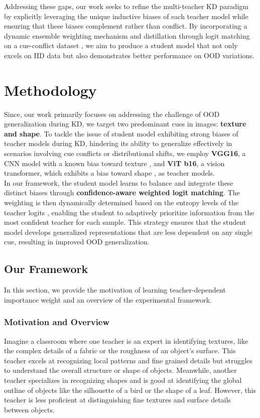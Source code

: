 \documentclass{article}
\begin{document}
Addressing these gaps, our work seeks to refine the multi-teacher KD paradigm by explicitly leveraging the unique inductive biases of each teacher model while ensuring that these biases complement rather than conflict. By incorporating a dynamic ensemble weighting mechanism and distillation through logit matching \cite{hinton2015distilling} on a cue-conflict dataset \cite{texture-vs-shape}, we aim to produce a student model that not only excels on IID data but also demonstrates better performance on OOD variations.


\section{Methodology}
Since, our work primarily focuses on addressing the challenge of OOD generalization during KD, we target two predominant cues in images: \textbf{texture and shape}. To tackle the issue of student model exhibiting strong biases of teacher models during KD, hindering its ability to generalize effectively in scenarios involving cue conflicts or distributional shifts, we employ \textbf{VGG16}, a CNN model with a known bias toward texture \cite{hermann2020origins}, and \textbf{ViT b16}, a vision transformer, which exhibits a bias toward shape \cite{naseer2021intriguing}, as teacher models. \\

In our framework, the student model learns to balance and integrate these distinct biases through \textbf{confidence-aware weighted logit matching}. The weighting is then dynamically determined based on the entropy levels of the teacher logits \cite{kwon2020adaptive}, enabling the student to adaptively prioritize information from the most confident teacher for each sample. This strategy ensures that the student model develops generalized representations that are less dependent on any single cue, resulting in improved OOD generalization.


\subsection{Our Framework}
In this section, we provide the motivation of learning teacher-dependent importance weight and an overview of the experimental framework.

\subsubsection{Motivation and Overview}
Imagine a classroom where one teacher is an expert in identifying textures, like the complex details of a fabric or the roughness of an object's surface. This teacher excels at recognizing local patterns and fine grained details but struggles to understand the overall structure or shape of objects. Meanwhile, another teacher specializes in recognizing shapes and is good at identifying the global outline of objects like the silhouette of a bird or the shape of a leaf. However, this teacher is less proficient at distinguishing fine textures and surface details between objects.
\end{document}
